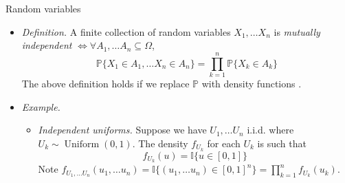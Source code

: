 \documentclass{beamer}
\numberwithin{equation}{section}
\begin{document}
\begin{frame}{Random variables}
    \begin{itemize}
        \item
        \textit{Definition.} A finite collection of random variables
        $ X_1, \ldots X_n $ is \textit{mutually independent}
        $ \Leftrightarrow \forall A_1, \ldots A_n \subseteq \Omega $,
        \begin{equation*}
            \mathbb{P}\{X_1 \in A_1, \ldots X_n \in A_n\} =
            \prod_{k = 1}^n\mathbb{P}\{X_k \in A_k\}
        \end{equation*}
        The above definition holds if we replace $ \mathbb{P} $ with density
        functions \cite{all_of_stats}.

        \item
        \textit{Example.}
        \begin{itemize}
            \item
            \textit{Independent uniforms.} Suppose we have $ U_1, \ldots U_n $
            i.i.d. where $ U_k \sim \operatorname{Uniform}(0, 1) $. The
            density $ f_{U_k} $ for each $ U_k $ is such that
            \begin{equation*}
                f_{U_k}(u) = \mathbb{I}\{u \in [0, 1]\}
            \end{equation*}
            Note $ f_{U_1, \ldots U_n}(u_1, \ldots u_n) =
            \mathbb{I}\{(u_1, \ldots u_n) \in [0, 1]^n\} =
            \prod_{k = 1}^nf_{U_k}(u_k) $.
        \end{itemize}
    \end{itemize}
\end{frame}
\end{document}
